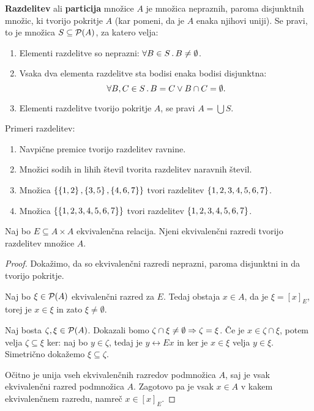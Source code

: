 \begin{definicija}
  \textbf{Razdelitev} ali \textbf{particija} množice $A$ je množica nepraznih, paroma
  disjunktnih množic, ki tvorijo pokritje $A$ (kar pomeni, da je $A$ enaka njihovi uniji). Se
  pravi, to je množica $S \subseteq \mathcal{P}(A)$, za katero velja:
  \begin{enumerate}
  \item Elementi razdelitve so neprazni: $\forall B \in S \,.\, B \neq \emptyset$.
  \item Vsaka dva elementa razdelitve sta bodisi enaka bodisi disjunktna:
    \begin{equation*}
      \forall B, C \in S \,.\, B = C \lor B \cap C = \emptyset.
    \end{equation*}
  \item Elementi razdelitve tvorijo pokritje $A$, se pravi $A = \bigcup S$.
  \end{enumerate}
\end{definicija}

\begin{zgled}
  Primeri razdelitev:
  \begin{enumerate}
  \item Navpične premice tvorijo razdelitev ravnine.
  \item Množici sodih in lihih števil tvorita razdelitev naravnih števil.
  \item Množica $\left\{\left\{1,2\right\}, \left\{3,5\right\}, \left\{4,6,7\right\}\right\}$ tvori razdelitev $\left\{1,2,3,4,5,6,7\right\}$.
  \item Množica $\left\{\left\{1,2,3,4,5,6,7\right\}\right\}$ tvori razdelitev $\left\{1,2,3,4,5,6,7\right\}$.
  \end{enumerate}
\end{zgled}

\begin{izrek}
  Naj bo $E \subseteq A \times A$ ekvivalenčna relacija. Njeni ekvivalenčni razredi tvorijo
  razdelitev množice $A$.
\end{izrek}

\begin{proof}
  Dokažimo, da so ekvivalenčni razredi neprazni, paroma disjunktni in da tvorijo pokritje.

  Naj bo $\xi \in \mathcal{P}(A)$ ekvivalenčni razred za $E$. Tedaj obstaja $x \in A$, da je $\xi = [x]_E$,
  torej je $x \in \xi$ in zato $\xi \neq \emptyset$.

  Naj bosta $\zeta, \xi \in \mathcal{P}(A)$. Dokazali bomo $\zeta \cap \xi \neq \emptyset \Rightarrow \zeta = \xi$. Če je $x \in \zeta \cap \xi$, potem velja $\zeta \subseteq \xi$ ker: naj bo $y \in \zeta$, tedaj je $y \rel{E} x$ in ker je $x \in \xi$ velja $y \in \xi$. Simetrično dokažemo $\xi \subseteq \zeta$.

  Očitno je unija vseh ekvivalenčnih razredov podmnožica $A$, saj je vsak ekvivalenčni razred podmnožica $A$. Zagotovo
  pa je vsak $x \in A$ v kakem ekvivalenčnem razredu, namreč $x \in [x]_E$.
\end{proof}

